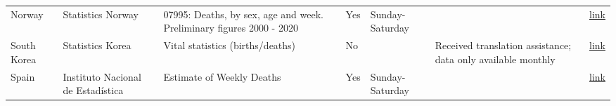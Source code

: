 \documentclass[
]{article}
\begin{document}
\begin{landscape}
\begin{table}[]
\begin{tabular}{p{.5in}p{1.5in}p{2in}p{1in}p{1.5in}p{1in}p{.5in}}
Norway           & Statistics Norway                                                                                                                                                    & 07995: Deaths, by sex, age and week. Preliminary figures 2000 - 2020                                                                                                       & Yes               & Sunday-Saturday                                          &                                                                          & \href{https://www.ssb.no/en/statbank/table/07995/}{link}                                                                                                                                                                                                                                                                                   \\
South Korea      & Statistics Korea                                                                                                                                                     & Vital statistics (births/deaths)                                                                                                                                           & No                &                                                          & Received translation assistance; data only available monthly & \href{http://kosis.kr/statisticsList/statisticsListIndex.do?menuId=M\_01\_01\&vwcd=MT\_ZTITLE\&parmTabId=M\_01\_01\#SelectStatsBoxDiv}{link}                                                                                                                                                                                               \\
Spain            & Instituto Nacional de Estadística                                                                                                                                    & Estimate of Weekly Deaths                                                                                                                                                  & Yes               & Sunday-Saturday                                          &                                                                          & \href{https://www.ine.es/en/experimental/defunciones/experimental_defunciones.htm}{link}                                                                                                                                                                                                                                                                       \\

\end{tabular}
\end{table}
\end{landscape}
\end{document}

